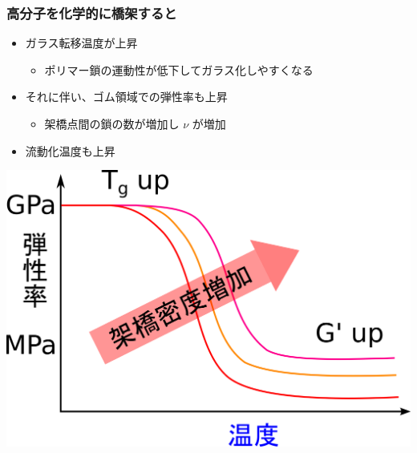 \documentclass[unicode,12pt]{beamer}%
\begin{document}
\begin{frame}
	\frametitle{高分子を化学的に橋架すると}
					\begin{itemize}
						\item ガラス転移温度が上昇
						\begin{itemize}
							\item ポリマー鎖の運動性が低下してガラス化しやすくなる
						\end{itemize}
						\item それに伴い、ゴム領域での弾性率も上昇
						\begin{itemize}
							\item 架橋点間の鎖の数が増加し $\nu$ が増加
						\end{itemize}
                        \item \alert{流動化温度も上昇}
					\end{itemize}
						\centering
						\includegraphics[width=.45\textwidth]{polymer_spectrum_3.png}
\end{frame}
\end{document}
